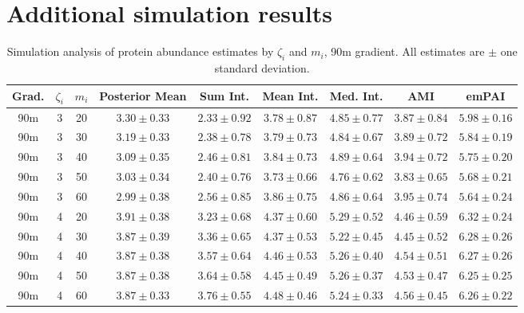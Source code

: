 
\clearpage

\section{Additional simulation results}

\begin{table}
\begin{center}
\caption{Simulation analysis of protein abundance estimates by $\zeta_i$ and $m_i$, 90m gradient. All estimates are $\pm$ one standard deviation. \label{supp:proteomics:tab:sim_estimates_90m}}
\begin{tabular}{ccc|c|ccccc}
 Grad. & $\zeta_i$ & $m_i$ & Posterior Mean & Sum Int. & Mean Int. & Med. Int. & AMI & emPAI \\ 
  \hline
90m &   3 &  20 & $3.30 \pm 0.33$ & $2.33 \pm 0.92$ & $3.78 \pm 0.87$ & $4.85 \pm 0.77$ & $3.87 \pm 0.84$ & $5.98 \pm 0.16$ \\ 
  90m &   3 &  30 & $3.19 \pm 0.33$ & $2.38 \pm 0.78$ & $3.79 \pm 0.73$ & $4.84 \pm 0.67$ & $3.89 \pm 0.72$ & $5.84 \pm 0.19$ \\ 
  90m &   3 &  40 & $3.09 \pm 0.35$ & $2.46 \pm 0.81$ & $3.84 \pm 0.73$ & $4.89 \pm 0.64$ & $3.94 \pm 0.72$ & $5.75 \pm 0.20$ \\ 
  90m &   3 &  50 & $3.03 \pm 0.34$ & $2.40 \pm 0.76$ & $3.73 \pm 0.66$ & $4.76 \pm 0.62$ & $3.83 \pm 0.65$ & $5.68 \pm 0.21$ \\ 
  90m &   3 &  60 & $2.99 \pm 0.38$ & $2.56 \pm 0.85$ & $3.86 \pm 0.75$ & $4.86 \pm 0.64$ & $3.95 \pm 0.74$ & $5.64 \pm 0.24$ \\ 
   \hline
90m &   4 &  20 & $3.91 \pm 0.38$ & $3.23 \pm 0.68$ & $4.37 \pm 0.60$ & $5.29 \pm 0.52$ & $4.46 \pm 0.59$ & $6.32 \pm 0.24$ \\ 
  90m &   4 &  30 & $3.87 \pm 0.39$ & $3.36 \pm 0.65$ & $4.37 \pm 0.53$ & $5.22 \pm 0.45$ & $4.45 \pm 0.52$ & $6.28 \pm 0.26$ \\ 
  90m &   4 &  40 & $3.87 \pm 0.38$ & $3.57 \pm 0.64$ & $4.46 \pm 0.53$ & $5.26 \pm 0.40$ & $4.54 \pm 0.51$ & $6.27 \pm 0.26$ \\ 
  90m &   4 &  50 & $3.87 \pm 0.38$ & $3.64 \pm 0.58$ & $4.45 \pm 0.49$ & $5.26 \pm 0.37$ & $4.53 \pm 0.47$ & $6.25 \pm 0.25$ \\ 
  90m &   4 &  60 & $3.87 \pm 0.33$ & $3.76 \pm 0.55$ & $4.48 \pm 0.46$ & $5.24 \pm 0.33$ & $4.56 \pm 0.45$ & $6.26 \pm 0.22$ \\ 

\end{tabular}
\end{center}
\end{table}

